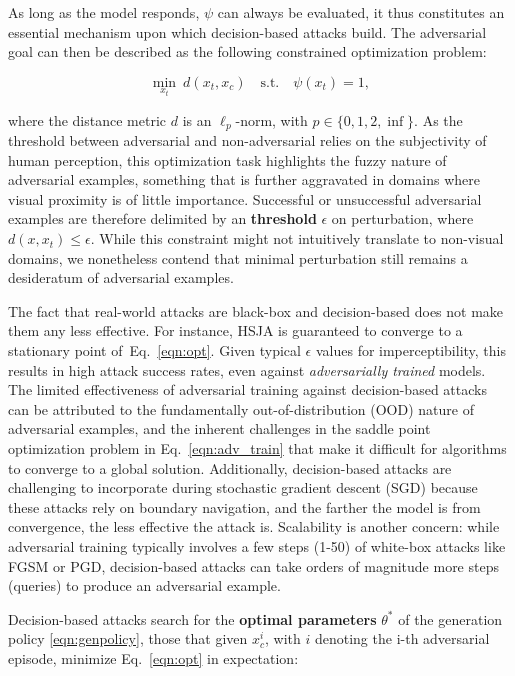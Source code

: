 As long as the model responds, $\psi$ can always be evaluated, it thus constitutes an essential mechanism upon which decision-based attacks build.
The adversarial goal can then be described as the following constrained optimization problem:

\begin{equation}
    \operatorname*{min}_{x_t} \: d(x_t,x_c) \quad \text{s.t.} \quad \psi(x_t) = 1,
\label{eqn:opt}
\end{equation}

\noindent where the distance metric $d$ is an $\ell_p$-norm, with $p \in \{0,1,2,\inf\}$.
As the threshold between adversarial and non-adversarial relies on the subjectivity of human perception, this optimization task highlights the fuzzy nature of adversarial examples, something that is further aggravated in domains where visual proximity is of little importance.
Successful or unsuccessful adversarial examples are therefore delimited by an \textbf{threshold} $\epsilon$ on perturbation, where $d(x,x_t) \leq \epsilon$.
While this constraint might not intuitively translate to non-visual domains, we nonetheless contend that minimal perturbation still remains a desideratum of adversarial examples.

The fact that real-world attacks are black-box and decision-based does not make them any less effective.
For instance, HSJA is guaranteed to converge to a stationary point of~Eq.~\eqref{eqn:opt}.
Given typical $\epsilon$ values for imperceptibility, this results in high attack success rates, even against \textit{adversarially trained} models. 
The limited effectiveness of adversarial training against decision-based attacks can be attributed to the fundamentally out-of-distribution (OOD) nature of adversarial examples, and the inherent challenges in the saddle point optimization problem in Eq.~\eqref{eqn:adv_train} that make it difficult for algorithms to converge to a global solution.
Additionally, decision-based attacks are challenging to incorporate during stochastic gradient descent (SGD) because these attacks rely on boundary navigation, and the farther the model is from convergence, the less effective the attack is.
Scalability is another concern: while adversarial training typically involves a few steps (1-50) of white-box attacks like FGSM or PGD, decision-based attacks can take orders of magnitude more steps (queries) to produce an adversarial example.

Decision-based attacks search for the \textbf{optimal parameters} $\theta^*$ of the generation policy \eqref{eqn:genpolicy}, those that given $x^{i}_{c}$, with $i$ denoting the i-th adversarial episode, minimize Eq.~\eqref{eqn:opt} in expectation:

